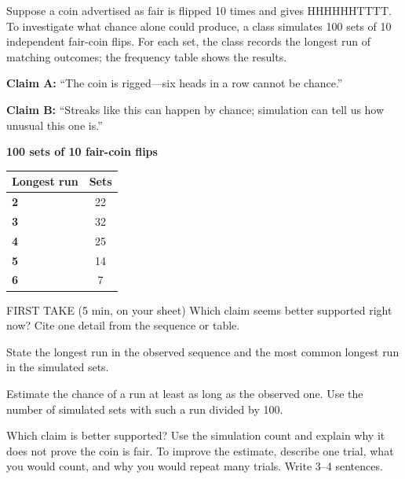 \documentclass[14pt]{extarticle}
\begin{document}
\pagestyle{empty}


\noindent\begin{minipage}[t]{0.57\linewidth}
\vspace{0pt}
Suppose a coin advertised as fair is flipped 10 times and gives HHHHHHTTTT. To investigate what chance alone could produce, a class simulates 100 sets of 10 independent fair-coin flips. For each set, the class records the longest run of matching outcomes; the frequency table shows the results.\par\smallskip \textbf{Claim A:} ``The coin is rigged---six heads in a row cannot be chance.''\par \textbf{Claim B:} ``Streaks like this can happen by chance; simulation can tell us how unusual this one is.''\par
\end{minipage}\hfill
\begin{minipage}[t]{0.40\linewidth}
\vspace{0pt}
\begin{center}
\textbf{100 sets of 10 fair-coin flips}\par\smallskip
\begin{tabular}{|l|c|}
\hline
\textbf{Longest run} & \textbf{Sets} \\ \hline
\textbf{2} & 22 \\ \hline
\textbf{3} & 32 \\ \hline
\textbf{4} & 25 \\ \hline
\textbf{5} & 14 \\ \hline
\textbf{6} & 7 \\ \hline
\end{tabular}
\end{center}
\end{minipage}

\begin{firsttakebox}{FIRST TAKE (5 min, on your sheet)}
Which claim seems better supported right now? Cite one detail from the sequence or table.
\end{firsttakebox}

\begin{description}[leftmargin=1.15in, labelwidth=1in, itemsep=2pt, topsep=2pt]
  \item[\dokbadge{1}~(a)] State the longest run in the observed sequence and the most common longest run in the simulated sets.
  \item[\dokbadge{2}~(b)] Estimate the chance of a run at least as long as the observed one. Use the number of simulated sets with such a run divided by 100.
  \item[\dokbadge{3}~(c)] Which claim is better supported? Use the simulation count and explain why it does not prove the coin is fair. To improve the estimate, describe one trial, what you would count, and why you would repeat many trials. Write 3--4 sentences.
\end{description}
\end{document}
